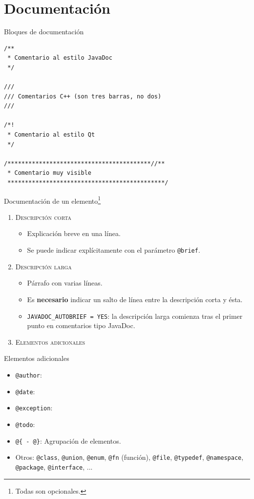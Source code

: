 \documentclass[12pt,xcolor=svgnames]{beamer}
\begin{document}
\section{Documentación}

\begin{frame}[fragile]{Bloques de documentación}
  \begin{verbatim}
/**
 * Comentario al estilo JavaDoc
 */

///
/// Comentarios C++ (son tres barras, no dos)
///

/*!
 * Comentario al estilo Qt
 */

/*****************************************//**
 * Comentario muy visible
 *********************************************/
  \end{verbatim}
\end{frame}

\begin{frame}{Documentación de un elemento\footnote{Todas son opcionales.}}
  \begin{enumerate}
  \item \textsc{Descripción corta}
    \begin{itemize}
    \item Explicación breve en una línea.
    \item Se puede indicar explícitamente con el parámetro \texttt{@brief}.
    \end{itemize}
  \item \textsc{Descripción larga}
    \begin{itemize}
    \item Párrafo con varias líneas.
    \item Es \textbf{necesario} indicar un salto de línea entre la descripción
      corta y ésta.
    \item \texttt{JAVADOC\_AUTOBRIEF = YES}: la descripción larga comienza tras
      el primer punto en comentarios tipo JavaDoc.
    \end{itemize}
  \item \textsc{Elementos adicionales}
  \end{enumerate}
\end{frame}

\begin{frame}{Elementos adicionales}
  \begin{itemize}
  \item \texttt{@author}:
  \item \texttt{@date}:
  \item \texttt{@exception}:
  \item \texttt{@todo}:
  \item \texttt{@\{ - @\}}: Agrupación de elementos.
  \item Otros: \texttt{@class}, \texttt{@union}, \texttt{@enum}, \texttt{@fn}
    (función), \texttt{@file}, \texttt{@typedef}, \texttt{@namespace},
    \texttt{@package}, \texttt{@interface}, ...
  \end{itemize}
\end{frame}
\end{document}
